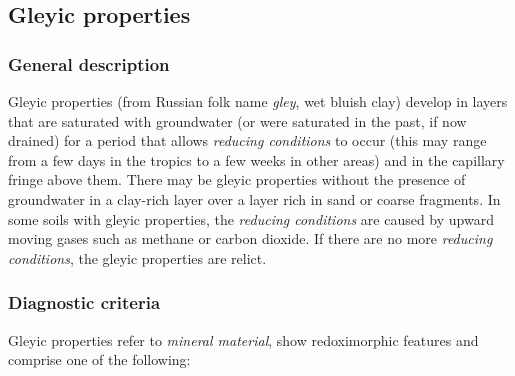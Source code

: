 \documentclass[
  letterpaper,
  DIV=11,
  numbers=noendperiod]{scrreprt}
\begin{document}
\hypertarget{gleyic-properties}{%
\subsection{Gleyic properties}\label{gleyic-properties}}

\hypertarget{general-description-44}{%
\subsubsection{General description}\label{general-description-44}}

Gleyic properties (from Russian folk name \emph{gley}, wet bluish clay)
develop in layers that are saturated with groundwater (or were saturated
in the past, if now drained) for a period that allows \emph{reducing
conditions} to occur (this may range from a few days in the tropics to a
few weeks in other areas) and in the capillary fringe above them. There
may be gleyic properties without the presence of groundwater in a
clay-rich layer over a layer rich in sand or coarse fragments. In some
soils with gleyic properties, the \emph{reducing conditions} are caused
by upward moving gases such as methane or carbon dioxide. If there are
no more \emph{reducing conditions}, the gleyic properties are relict.

\hypertarget{diagnostic-criteria-45}{%
\subsubsection{Diagnostic criteria}\label{diagnostic-criteria-45}}

Gleyic properties refer to \emph{mineral material}, show redoximorphic
features and comprise one of the following:
\end{document}
